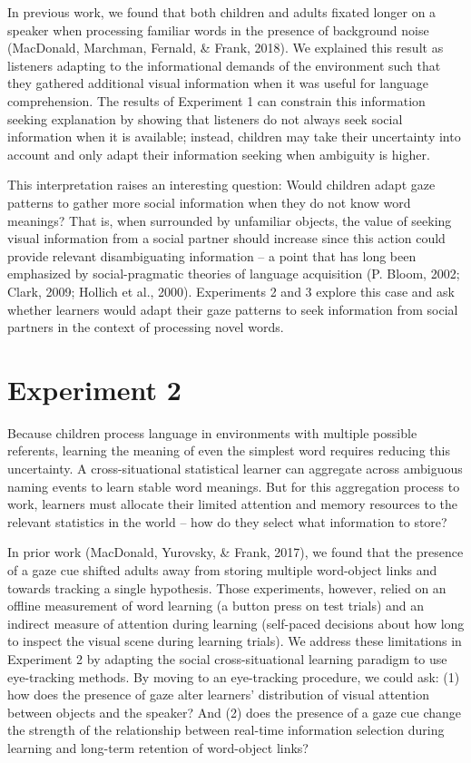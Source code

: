\documentclass[man,floatsintext]{apa6}
\begin{document}
In previous work, we found that both children and adults fixated longer
on a speaker when processing familiar words in the presence of
background noise (MacDonald, Marchman, Fernald, \& Frank, 2018). We
explained this result as listeners adapting to the informational demands
of the environment such that they gathered additional visual information
when it was useful for language comprehension. The results of Experiment
1 can constrain this information seeking explanation by showing that
listeners do not always seek social information when it is available;
instead, children may take their uncertainty into account and only adapt
their information seeking when ambiguity is higher.

This interpretation raises an interesting question: Would children adapt
gaze patterns to gather more social information when they do not know
word meanings? That is, when surrounded by unfamiliar objects, the value
of seeking visual information from a social partner should increase
since this action could provide relevant disambiguating information -- a
point that has long been emphasized by social-pragmatic theories of
language acquisition (P. Bloom, 2002; Clark, 2009; Hollich et al.,
2000). Experiments 2 and 3 explore this case and ask whether learners
would adapt their gaze patterns to seek information from social partners
in the context of processing novel words.

\section{Experiment 2}\label{experiment-2}

Because children process language in environments with multiple possible
referents, learning the meaning of even the simplest word requires
reducing this uncertainty. A cross-situational statistical learner can
aggregate across ambiguous naming events to learn stable word meanings.
But for this aggregation process to work, learners must allocate their
limited attention and memory resources to the relevant statistics in the
world -- how do they select what information to store?

In prior work (MacDonald, Yurovsky, \& Frank, 2017), we found that the
presence of a gaze cue shifted adults away from storing multiple
word-object links and towards tracking a single hypothesis. Those
experiments, however, relied on an offline measurement of word learning
(a button press on test trials) and an indirect measure of attention
during learning (self-paced decisions about how long to inspect the
visual scene during learning trials). We address these limitations in
Experiment 2 by adapting the social cross-situational learning paradigm
to use eye-tracking methods. By moving to an eye-tracking procedure, we
could ask: (1) how does the presence of gaze alter learners'
distribution of visual attention between objects and the speaker? And
(2) does the presence of a gaze cue change the strength of the
relationship between real-time information selection during learning and
long-term retention of word-object links?
\end{document}
